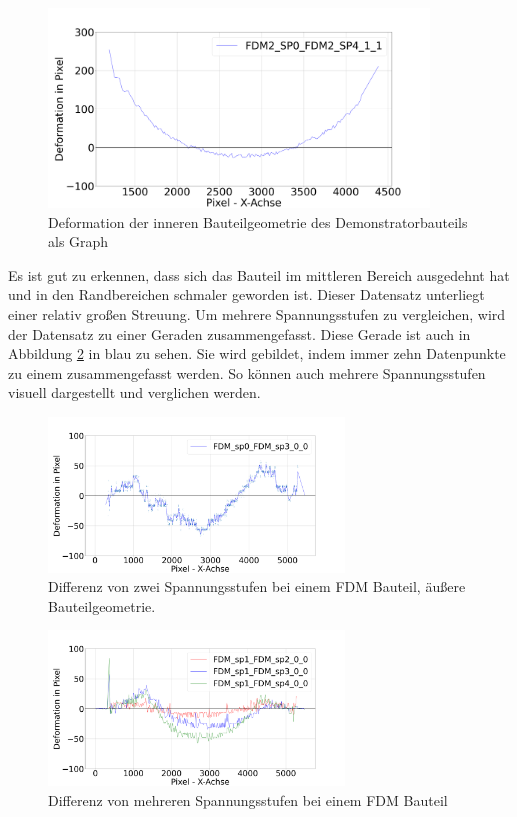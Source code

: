 \begin{figure}[H]
    \centering
    \includegraphics[width=0.9\textwidth]{images/FDM_sp0_sp4_inner.png}
    \caption{Deformation der inneren Bauteilgeometrie 
    des Demonstratorbauteils als Graph}
    \label{fig:deformation_data_graph}
\end{figure}

Es ist gut zu erkennen, dass sich das Bauteil 
im mittleren Bereich ausgedehnt hat und in den Randbereichen schmaler geworden ist.
Dieser Datensatz unterliegt einer relativ großen Streuung. Um mehrere Spannungsstufen
zu vergleichen, wird der Datensatz zu einer Geraden zusammengefasst.
Diese Gerade ist auch in Abbildung \ref{fig:deformation_data} in blau zu sehen. Sie wird 
gebildet, indem immer zehn Datenpunkte zu einem zusammengefasst werden. 
So können auch mehrere Spannungsstufen visuell dargestellt und verglichen werden.

\begin{figure}[H]
    \centering
    \includegraphics[width=0.7\textwidth]{images/FDM_sp0_sp3_defo_plot.png}
    \caption{Differenz von zwei Spannungsstufen bei einem FDM Bauteil, äußere 
    Bauteilgeometrie.}
    \label{fig:deformation_data}
\end{figure}

\begin{figure}[H]
    \centering
    \includegraphics[width=0.7\textwidth]{images/FDM_sp0_many_defo_plot2.png}
    \caption{Differenz von mehreren Spannungsstufen bei einem FDM Bauteil}
    \label{fig:deformation_data_all}
\end{figure}



